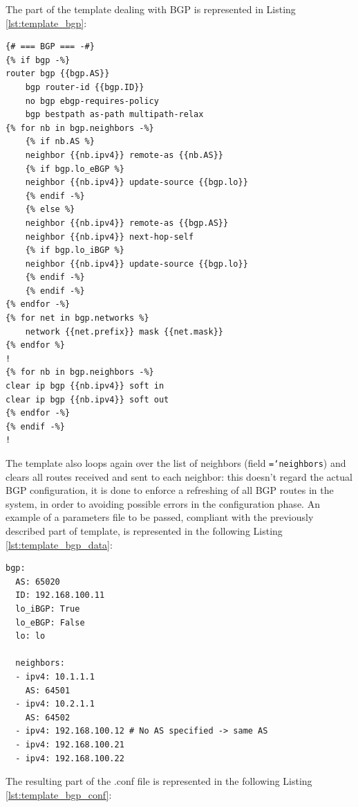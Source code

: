 \documentclass{report}
\newcommand{\monospaced}[1]{\texttt{\hyphenchar\font=`\-#1}}
\begin{document}
The part of the template dealing with BGP is represented in Listing \ref{lst:template_bgp}:
\begin{lstlisting}[style=styleJinja, caption=FRR template - BGP, label=lst:template_bgp]
{# === BGP === -#}
{% if bgp -%}
router bgp {{bgp.AS}}
    bgp router-id {{bgp.ID}}
    no bgp ebgp-requires-policy
    bgp bestpath as-path multipath-relax
{% for nb in bgp.neighbors -%}
    {% if nb.AS %}
    neighbor {{nb.ipv4}} remote-as {{nb.AS}}
    {% if bgp.lo_eBGP %}
    neighbor {{nb.ipv4}} update-source {{bgp.lo}}
    {% endif -%}
    {% else %}
    neighbor {{nb.ipv4}} remote-as {{bgp.AS}}
    neighbor {{nb.ipv4}} next-hop-self
    {% if bgp.lo_iBGP %}
    neighbor {{nb.ipv4}} update-source {{bgp.lo}}
    {% endif -%}
    {% endif -%}
{% endfor -%}
{% for net in bgp.networks %}
    network {{net.prefix}} mask {{net.mask}}
{% endfor %}
!
{% for nb in bgp.neighbors -%}
clear ip bgp {{nb.ipv4}} soft in
clear ip bgp {{nb.ipv4}} soft out
{% endfor -%}
{% endif -%}
!
\end{lstlisting}
The template also loops again over the list of neighbors (field \monospaced{neighbors}) and clears all routes received and sent to each neighbor: this doesn't regard the actual BGP configuration, it is done to enforce a refreshing of all BGP routes in the system, in order to avoiding possible errors in the configuration phase.\newline
An example of a parameters file to be passed, compliant with the previously described part of template, is represented in the following Listing \ref{lst:template_bgp_data}:
\begin{lstlisting}[style=styleYml, caption=BGP parameters, label=lst:template_bgp_data,
    morekeywords={bgp, AS, ID, lo_iBGP, lo_eBGP, lo,neighbors,ipv4}]
bgp:
  AS: 65020
  ID: 192.168.100.11
  lo_iBGP: True
  lo_eBGP: False
  lo: lo

  neighbors:
  - ipv4: 10.1.1.1
    AS: 64501
  - ipv4: 10.2.1.1
    AS: 64502
  - ipv4: 192.168.100.12 # No AS specified -> same AS
  - ipv4: 192.168.100.21
  - ipv4: 192.168.100.22
\end{lstlisting}
The resulting part of the .conf file is represented in the following Listing \ref{lst:template_bgp_conf}:
\end{document}
